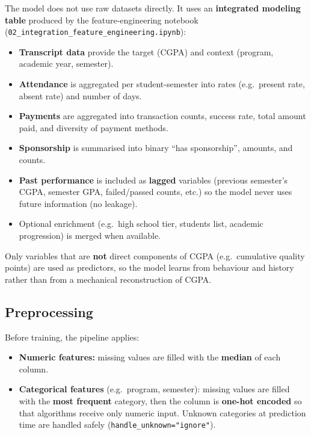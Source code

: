 \documentclass[12pt,a4paper]{article}
\begin{document}
The model does not use raw datasets directly. It uses an \textbf{integrated modeling table} produced by the feature-engineering notebook (\texttt{02\_integration\_feature\_engineering.ipynb}):

\begin{itemize}
  \item \textbf{Transcript data} provide the target (CGPA) and context (program, academic year, semester).
  \item \textbf{Attendance} is aggregated per student-semester into rates (e.g.\ present rate, absent rate) and number of days.
  \item \textbf{Payments} are aggregated into transaction counts, success rate, total amount paid, and diversity of payment methods.
  \item \textbf{Sponsorship} is summarised into binary ``has sponsorship'', amounts, and counts.
  \item \textbf{Past performance} is included as \textbf{lagged} variables (previous semester's CGPA, semester GPA, failed/passed counts, etc.) so the model never uses future information (no leakage).
  \item Optional enrichment (e.g.\ high school tier, students list, academic progression) is merged when available.
\end{itemize}

Only variables that are \textbf{not} direct components of CGPA (e.g.\ cumulative quality points) are used as predictors, so the model learns from behaviour and history rather than from a mechanical reconstruction of CGPA.

\subsection{Preprocessing}

Before training, the pipeline applies:

\begin{itemize}
  \item \textbf{Numeric features:} missing values are filled with the \textbf{median} of each column.
  \item \textbf{Categorical features} (e.g.\ program, semester): missing values are filled with the \textbf{most frequent} category, then the column is \textbf{one-hot encoded} so that algorithms receive only numeric input. Unknown categories at prediction time are handled safely (\texttt{handle\_unknown="ignore"}).
\end{itemize}
\end{document}
